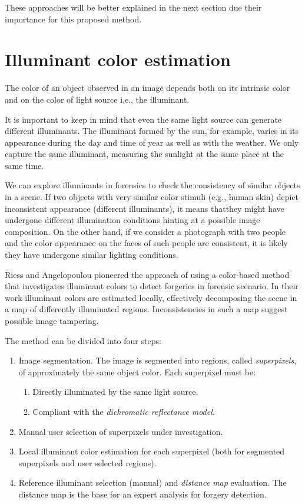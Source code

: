 These approaches will be better explained in the next section due their importance for this proposed method.

\section{Illuminant color estimation}


The color of an object observed in an image depends both on its intrinsic color and on the color of light source i.e., the illuminant. 

It is important to keep in mind that even the same light source can generate different illuminants. The illuminant formed by the sun, for example, varies in its appearance during the day and time of year as well as with the weather. We only capture the same illuminant, measuring the sunlight at the same place at the same time.

We can explore illuminants in forensics to check the consistency of similar objects in a scene. If two objects with very similar color stimuli (e.g., human skin) depict inconsistent appearance (different illuminants), it means  thatthey might have undergone different illumination conditions hinting at a possible image composition. On the other hand, if we consider a photograph with two people and the color appearance on the faces of such people are consistent, it is likely they have undergone similar lighting conditions.

Riess and Angelopoulou\cite{riess2010scene} pioneered the approach of using a color-based method that investigates illuminant colors to detect forgeries in forensic scenario. In their work illuminant colors are estimated locally, effectively decomposing the scene in a map of differently illuminated regions. Inconsistencies in such a map suggest possible image tampering.

The method can be divided into four steps:

\begin{enumerate}
\item Image segmentation. The image is segmented into regions, called \emph{superpixels}, of approximately the same object color. Each superpixel must be:
\begin{enumerate}
\item Directly illuminated by the same light source.
\item Compliant with the \emph{dichromatic reflectance model}\cite{tan2004color}.
\end{enumerate}
\item Manual user selection of superpixels under investigation.
\item Local illuminant color estimation for each superpixel (both for segmented superpixels and user selected regions).
\item Reference illuminant selection (manual) and \emph{distance map} evaluation. The distance map is the base for an expert analysis for forgery detection.
\end{enumerate}

